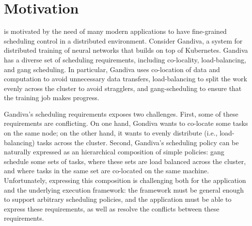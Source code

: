 \section{Motivation}
\label{sec:motivation}


\name{} is motivated by the need of many modern applications to have fine-grained scheduling control in a distributed environment. Consider Gandiva\cite{gandiva}, a system for distributed training of neural networks that builds on top of Kubernetes\cite{kubernetes}. Gandiva has a diverse set of scheduling requirements, including co-locality, load-balancing, and gang scheduling. In particular, Gandiva uses co-location of data and computation to avoid unnecessary data transfers, load-balancing to split the work evenly across the cluster to avoid stragglers, and gang-scheduling to ensure that the training job makes progress. 

Gandiva's scheduling requirements exposes two challenges. First, some of these requirements are conflicting. On one hand, Gondiva wants to  co-locate some tasks on the same node; on the other hand, it wants to evenly distribute (i.e., load-balancing) tasks across the cluster. Second, Gandiva's scheduling policy can be naturally expressed as an hierarchical composition of simple policies: gang schedule some sets of tasks, where these sets are load balanced across the cluster, and where tasks in the same set are co-located on the same machine. Unfortunately, expressing this composition is challenging both for the application and the underlying execution framework: the framework must be general enough to support arbitrary scheduling policies, and the application must be able to express these requirements, as well as resolve the conflicts between these requirements. %

